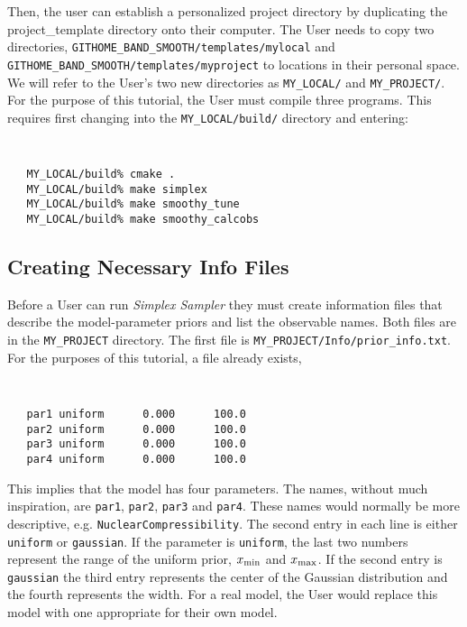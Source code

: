 \documentclass[UserManual.tex]{subfiles}
\begin{document}
Then, the user can establish a personalized project directory by duplicating the project\_template directory onto their computer. The User needs to copy two directories, {\tt GITHOME\_BAND\_SMOOTH/templates/mylocal} and {\tt GITHOME\_BAND\_SMOOTH/templates/myproject} to locations in their personal space. We will refer to the User's two new directories as {\tt MY\_LOCAL/} and {\tt MY\_PROJECT/}. For the purpose of this tutorial, the User must compile three programs. This requires first changing into the {\tt MY\_LOCAL/build/} directory and entering:
{\tt
\begin{verbatim}
   MY_LOCAL/build% cmake .
   MY_LOCAL/build% make simplex
   MY_LOCAL/build% make smoothy_tune
   MY_LOCAL/build% make smoothy_calcobs
\end{verbatim}
}

\subsection{Creating Necessary Info Files}
Before a User can run {\it Simplex Sampler} they must create information files that describe the model-parameter priors and list the observable names. Both files are in the {\tt MY\_PROJECT} directory. The first file is {\tt MY\_PROJECT/Info/prior\_info.txt}. For the purposes of this tutorial, a file already exists,
{\tt
\begin{verbatim}
   par1 uniform      0.000      100.0
   par2 uniform      0.000      100.0
   par3 uniform      0.000      100.0
   par4 uniform      0.000      100.0
\end{verbatim}
}
This implies that the model has four parameters. The names, without much inspiration, are {\tt par1}, {\tt par2}, {\tt par3} and {\tt par4}. These names would normally be more descriptive, e.g. {\tt NuclearCompressibility}. The second entry in each line is either {\tt uniform} or {\tt gaussian}. If the parameter is {\tt uniform}, the last two numbers represent the range of the uniform prior, $x_{\rm min}$ and $x_{\rm max}$. If the second entry is {\tt gaussian} the third entry represents the center of the Gaussian distribution and the fourth represents the width. For a real model, the User would replace this model with one appropriate for their own model.
\end{document}
